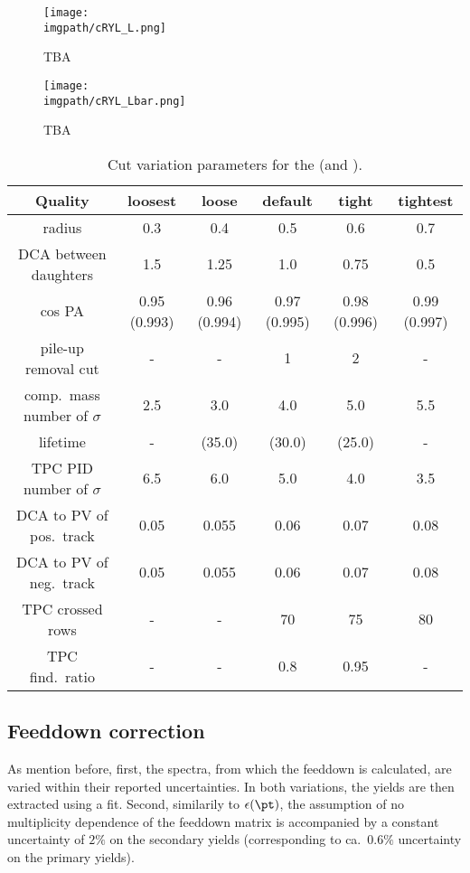 \begin{figure}
\texttt{[image: \\imgpath/cRYL\_L.png]}
\caption{TBA}
\label{fig:analysis:rylL}
\end{figure}

\begin{figure}
\texttt{[image: \\imgpath/cRYL\_Lbar.png]}
\caption{TBA}
\label{fig:analysis:rylAL}
\end{figure}

\begin{table}[h!]
\begin{center}
\begin{tabular}{|c|c|c|c|c|c|}
\hline
 \bf Quality & \bf loosest & \bf loose & \bf default & \bf tight & \bf tightest \\ \hline
radius & 0.3 & 0.4 & 0.5 & 0.6 & 0.7 \\ \hline
DCA between daughters & 1.5 & 1.25 & 1.0 & 0.75 & 0.5 \\ \hline
cos PA & 0.95 (0.993) & 0.96 (0.994) & 0.97 (0.995) & 0.98 (0.996) & 0.99 (0.997) \\ \hline
pile-up removal cut & - & - & 1 & 2 & - \\ \hline
comp.\ mass number of $\sigma$ & 2.5 & 3.0 & 4.0 & 5.0 & 5.5 \\ \hline
lifetime & - & (35.0) & (30.0) & (25.0) & - \\ \hline
TPC PID number of $\sigma$ & 6.5 & 6.0 & 5.0 & 4.0 & 3.5 \\ \hline
DCA to PV of pos.\ track & 0.05 & 0.055 & 0.06 & 0.07 & 0.08 \\ \hline
DCA to PV of neg.\ track & 0.05 & 0.055 & 0.06 & 0.07 & 0.08 \\ \hline
TPC crossed rows & - & - & 70 & 75 & 80 \\ \hline
TPC find.\ ratio & - & - & 0.8 & 0.95 & - \\ \hline
\end{tabular}
\end{center}
\caption{Cut variation parameters for the \KOs (\LA and \AL).}
\label{tab:analysis:cutvariations}
\end{table}

\subsection{Feeddown correction}

As mention before, first, the \XI spectra, from which the feeddown is calculated, are varied within their reported uncertainties. In both variations, the yields are then extracted using a fit.  Second, similarily to $\epsilon ( \pt )$, the assumption of no multiplicity dependence of the feeddown matrix is accompanied by a constant uncertainty of $2 \%$ on the secondary yields (corresponding to ca.\ $0.6\%$ uncertainty on the primary yields). %

